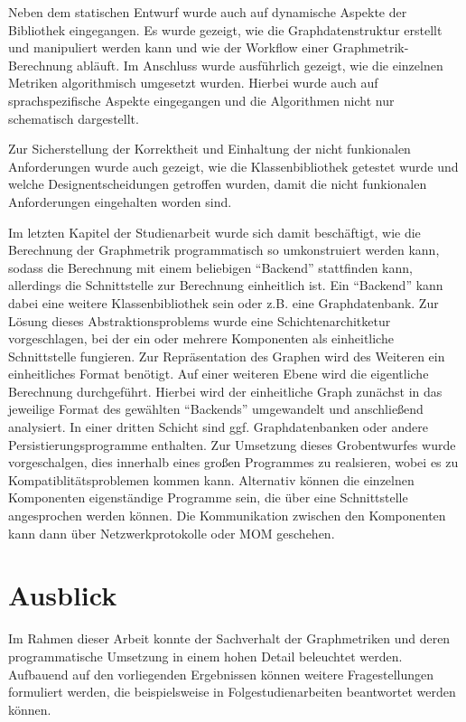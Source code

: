 \documentclass[a4paper,12pt,ngerman,chapterprefix=false,listof=totoc,bibliography=totoc]{scrreprt}
\begin{document}
{{{Neben dem statischen Entwurf wurde auch auf dynamische Aspekte der Bibliothek eingegangen. Es wurde gezeigt, wie die Graphdatenstruktur erstellt und manipuliert werden kann und wie der Workflow einer Graphmetrik-Berechnung abläuft. Im Anschluss wurde ausführlich gezeigt, wie die einzelnen Metriken algorithmisch umgesetzt wurden. Hierbei wurde auch auf sprachspezifische Aspekte eingegangen und die Algorithmen nicht nur schematisch dargestellt.

Zur Sicherstellung der Korrektheit und Einhaltung der nicht funkionalen Anforderungen wurde auch gezeigt, wie die Klassenbibliothek getestet wurde und welche Designentscheidungen getroffen wurden, damit die nicht funkionalen Anforderungen eingehalten worden sind.

Im letzten Kapitel der Studienarbeit wurde sich damit beschäftigt, wie die Berechnung der Graphmetrik programmatisch so umkonstruiert werden kann, sodass die Berechnung mit einem beliebigen "`Backend"' stattfinden kann, allerdings die Schnittstelle zur Berechnung einheitlich ist. Ein "`Backend"' kann dabei eine weitere Klassenbibliothek sein oder z.B. eine Graphdatenbank. Zur Lösung dieses Abstraktionsproblems wurde eine Schichtenarchitketur vorgeschlagen, bei der ein oder mehrere Komponenten als einheitliche Schnittstelle fungieren. Zur Repräsentation des Graphen wird des Weiteren ein einheitliches Format benötigt. Auf einer weiteren Ebene wird die eigentliche Berechnung durchgeführt. Hierbei wird der einheitliche Graph zunächst in das jeweilige Format des gewählten "`Backends"' umgewandelt und anschließend analysiert. In einer dritten Schicht sind ggf. Graphdatenbanken oder andere Persistierungsprogramme enthalten. Zur Umsetzung dieses Grobentwurfes wurde vorgeschalgen, dies innerhalb eines großen Programmes zu realsieren, wobei es zu Kompatiblitätsproblemen kommen kann. Alternativ können die einzelnen Komponenten eigenständige Programme sein, die über eine Schnittstelle angesprochen werden können. Die Kommunikation zwischen den Komponenten kann dann über Netzwerkprotokolle oder MOM geschehen.
}
\section{Ausblick}
{
Im Rahmen dieser Arbeit konnte der Sachverhalt der Graphmetriken und deren programmatische Umsetzung in einem hohen Detail beleuchtet werden. Aufbauend auf den vorliegenden Ergebnissen können weitere Fragestellungen formuliert werden, die beispielsweise in Folgestudienarbeiten beantwortet werden können. 

}}}
\end{document}
